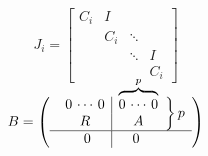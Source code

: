 \documentclass{article}
\begin{document}
\[
  J_i =
  \begin{bmatrix}
    C_i & I \\
    & C_i & \ddots & \\
    & & \ddots& I \\
    & & & C_i
  \end{bmatrix}
\]

\[
  B=\left(
\begin{array}{c}
\left.\begin{array}{c|c}
0\,\cdots\, 0 & \smash{\overbrace{0\,\cdots\, 0\strut}^p}\\
R & A
\end{array}\right\}p\\  \hline
\begin{array}{c|c}
\hspace*{-1.3em}0\quad & \quad 0
\end{array}
\end{array}\right)
\]

\end{document}
